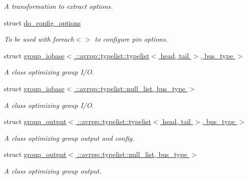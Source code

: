 \begin{DoxyCompactItemize}
\begin{DoxyCompactList}\small\item\em A transformation to extract options. \item\end{DoxyCompactList}\item 
struct \hyperlink{structavrpp_1_1bus_1_1do__config__options}{do\_\-config\_\-options}
\begin{DoxyCompactList}\small\item\em To be used with foreach$<$$>$ to configure pin options. \item\end{DoxyCompactList}\item 
struct \hyperlink{structavrpp_1_1bus_1_1group__iobase_3_01_1_1avrpp_1_1typelist_1_1typelist_3_01head_00_01tail_01_4_00_01bus__type_01_4}{group\_\-iobase$<$ ::avrpp::typelist::typelist$<$ head, tail $>$, bus\_\-type $>$}
\begin{DoxyCompactList}\small\item\em A class optimizing group I/O. \item\end{DoxyCompactList}\item 
struct \hyperlink{structavrpp_1_1bus_1_1group__iobase_3_01_1_1avrpp_1_1typelist_1_1null__list_00_01bus__type_01_4}{group\_\-iobase$<$ ::avrpp::typelist::null\_\-list, bus\_\-type $>$}
\begin{DoxyCompactList}\small\item\em A class optimizing group I/O. \item\end{DoxyCompactList}\item 
struct \hyperlink{structavrpp_1_1bus_1_1group__output_3_01_1_1avrpp_1_1typelist_1_1typelist_3_01head_00_01tail_01_4_00_01bus__type_01_4}{group\_\-output$<$ ::avrpp::typelist::typelist$<$ head, tail $>$, bus\_\-type $>$}
\begin{DoxyCompactList}\small\item\em A class optimizing group output and config. \item\end{DoxyCompactList}\item 
struct \hyperlink{structavrpp_1_1bus_1_1group__output_3_01_1_1avrpp_1_1typelist_1_1null__list_00_01bus__type_01_4}{group\_\-output$<$ ::avrpp::typelist::null\_\-list, bus\_\-type $>$}
\begin{DoxyCompactList}\small\item\em A class optimizing group output. \item\end{DoxyCompactList}\item 

\end{DoxyCompactItemize}
